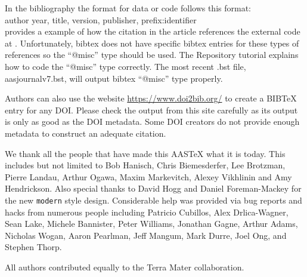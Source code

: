 \documentclass[linenumbers,trackchanges]{aastex701}
\begin{document}
In the bibliography the format for data or code follows this format: \\

\noindent author year, title, version, publisher, prefix:identifier\\

\citet{2015ApJ...805...23C} provides a example of how the citation in the
article references the external code at
.  Unfortunately, bibtex does
not have specific bibtex entries for these types of references so the
``@misc'' type should be used.  The Repository tutorial explains how to
code the ``@misc'' type correctly.  The most recent .bst file, aasjournalv7.bst, will output bibtex ``@misc'' type properly.

Authors can also use the website \url{https://www.doi2bib.org/} to create a BIBTeX entry for any DOI. Please check the output from this site carefully as its output is only as good as the DOI metadata. Some DOI creators do not provide enough metadata to construct an adequate citation.

\begin{acknowledgments}
We thank all the people that have made this AASTeX what it is today.  This
includes but not limited to Bob Hanisch, Chris Biemesderfer, Lee Brotzman,
Pierre Landau, Arthur Ogawa, Maxim Markevitch, Alexey Vikhlinin and Amy
Hendrickson. Also special thanks to David Hogg and Daniel Foreman-Mackey
for the new {\tt\string modern} style design. Considerable help was provided via bug
reports and hacks from numerous people including Patricio Cubillos, Alex
Drlica-Wagner, Sean Lake, Michele Bannister, Peter Williams, Jonathan
Gagne, Arthur Adams, Nicholas Wogan, Aaron Pearlman, Jeff Mangum, Mark Durre, Joel Ong, and Stephen Thorp.
\end{acknowledgments}

\begin{contribution}

All authors contributed equally to the Terra Mater collaboration.


\end{contribution}
\end{document}

